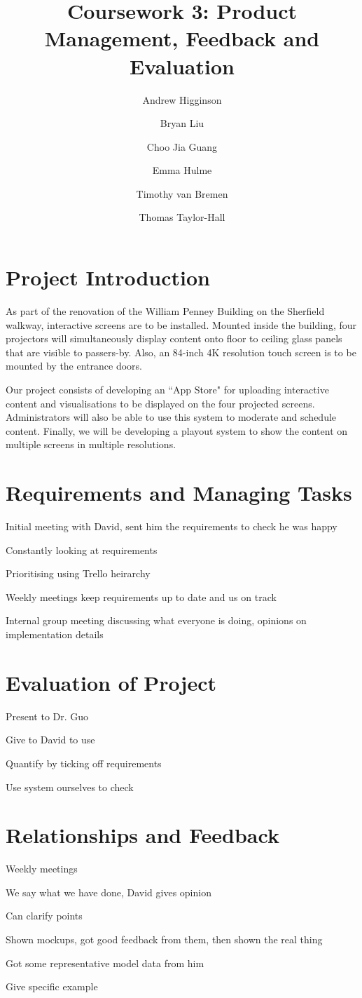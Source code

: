 \documentclass{article}
\begin{document}
\title{Coursework 3: Product Management, Feedback and Evaluation}
\author{Andrew Higginson \and Bryan Liu \and Choo Jia Guang \and Emma Hulme \and Timothy van Bremen \and Thomas Taylor-Hall}
\maketitle

\section{Project Introduction}
As part of the renovation of the William Penney Building on the Sherfield 
walkway, interactive screens are to be installed. Mounted inside the building, four projectors will simultaneously display content onto floor to ceiling glass
panels that are visible to passers-by. Also, an 84-inch 4K resolution touch 
screen is to be mounted by the entrance doors. 

Our project consists of developing an ``App Store" for uploading interactive content and visualisations to be displayed on the four projected screens. Administrators will also be able to use this system to moderate and schedule content. Finally, we will be developing a playout system to show the content on multiple screens in multiple resolutions.


\section{Requirements and Managing Tasks}
Initial meeting with David, sent him the requirements to check he was happy

Constantly looking at requirements

Prioritising using Trello heirarchy

Weekly meetings keep requirements up to date and us on track

Internal group meeting discussing what everyone is doing, opinions on implementation details


\section{Evaluation of Project}
Present to Dr. Guo

Give to David to use

Quantify by ticking off requirements

Use system ourselves to check


\section{Relationships and Feedback}
Weekly meetings

We say what we have done, David gives opinion

Can clarify points

Shown mockups, got good feedback from them, then shown the real thing

Got some representative model data from him

Give specific example
\end{document}

